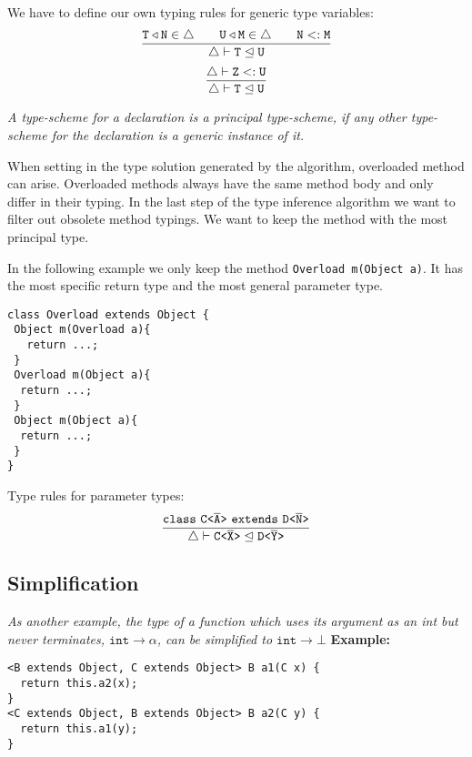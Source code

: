 \documentclass[a4paper,USenglish,cleveref, autoref, thm-restate]{lipics-v2021}
\begin{document}
We have to define our own typing rules for generic type variables:
\begin{align*}
\frac{\displaystyle \mathtt{
  T \triangleleft N \in \triangle \quad \quad U \triangleleft M \in \triangle \quad \quad 
  N <: M
  }
}{\displaystyle \mathtt{\triangle \vdash T \trianglelefteq U}}
\end{align*}
\begin{align*}
\frac{\displaystyle \mathtt{
  \triangle \vdash Z <: U
  }
}{\displaystyle \mathtt{\triangle \vdash T \trianglelefteq U}}
\end{align*}

\emph{A type-scheme for a declaration is a \emph{principal type-scheme}, if any
    other type-scheme for the 
declaration is a generic instance of it.}\cite{DM82}

When setting in the type solution generated by the \unify{} algorithm,
overloaded method can arise.
Overloaded methods always have the same method body and only differ in their typing.
In the last step of the type inference algorithm we want to filter out obsolete method typings.
We want to keep the method with the most principal type.

In the following example we only keep the method
\texttt{Overload m(Object a)}.
It has the most specific return type and the most general parameter type.
\begin{lstlisting}
class Overload extends Object {
 Object m(Overload a){
   return ...;
 }
 Overload m(Object a){
  return ...;
 }
 Object m(Object a){
  return ...;
 }
}
\end{lstlisting}

Type rules for parameter types:
\begin{align*}
  \ddfrac{\mathtt{    
    \texttt{class}\ \exptype{C}{\ol{A}}\ \texttt{extends}\ \exptype{D}{\ol{N}}
    }
  }{\mathtt{\triangle \vdash \exptype{C}{\ol{X}} \trianglelefteq \exptype{D}{\ol{Y}}}}
\end{align*}




\subsection{Simplification}
\emph{As another example, the type of a function which uses its argument as an int but never terminates,
$\texttt{int} \to \alpha$, can be simplified to $\texttt{int} \to \bot$}
\cite{10.1145/3409006}
\textbf{Example:}
\begin{lstlisting}
<B extends Object, C extends Object> B a1(C x) {
  return this.a2(x);
}
<C extends Object, B extends Object> B a2(C y) {
  return this.a1(y);
}
\end{lstlisting}
\end{document}

